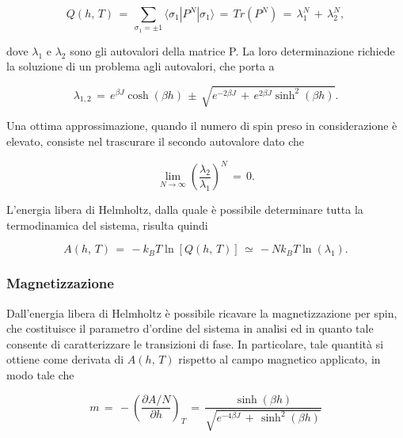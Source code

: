 \begin{equation}
    Q\left(h,\,T\right)\,=\,\sum_{\sigma_1=\pm 1} \langle \sigma_1 | P^N | \sigma_1 \rangle \,=\,Tr\left(P^N\right)\,=\,\lambda_1^N\,+\,\lambda_2^N,
    \label{eq: part_func_simp}
\end{equation}

dove $\lambda_1$ e $\lambda_2$ sono gli autovalori della matrice P. La loro determinazione richiede la soluzione di un problema agli 
autovalori, che porta a 

\begin{equation}
    \lambda_{1,2}\,=\,e^{\beta J} \cosh{\left(\beta h\right)}\,\pm\,\sqrt{e^{- 2 \beta J}\,+\,e^{2 \beta J} \sinh^2{\left(\beta h\right)}}.
    \label{eq: autoval_P}
\end{equation}

Una ottima approssimazione, quando il numero di spin preso in considerazione è elevato, consiste nel trascurare il secondo autovalore 
dato che 

\begin{equation}
    \lim_{N \to \infty} \left(\frac{\lambda_2}{\lambda_1}\right)^N\,=\,0.
    \label{eq: approx_Q}
\end{equation}

L'energia libera di Helmholtz, dalla quale è possibile determinare tutta la termodinamica del sistema, risulta quindi

\begin{equation}
    A\left(h,\,T\right)\,=\,-k_B T \ln{\left[Q\left(h,\,T\right)\right]}\,\simeq\,-Nk_BT \ln{\left(\lambda_1\right)}.
    \label{eq: en_lib}
\end{equation}



\subsubsection{Magnetizzazione}

Dall'energia libera di Helmholtz è possibile ricavare la magnetizzazione per spin, che costituisce il parametro d'ordine del 
sistema in analisi ed in quanto tale consente di caratterizzare le transizioni di fase. In particolare, tale quantità si 
ottiene come derivata di $A\left(h,\,T\right)$ rispetto al campo magnetico applicato, in modo tale che

\begin{equation}
    m\,=\,-\left(\frac{\partial A/N}{\partial h}\right)_T\,=\,\frac{\sinh{\left(\beta h\right)}}{\sqrt{e^{-4\beta J}\,+\,\sinh^2\left(\beta h\right)}}
    \label{eq: magn_Ising1D_corr}
\end{equation}

